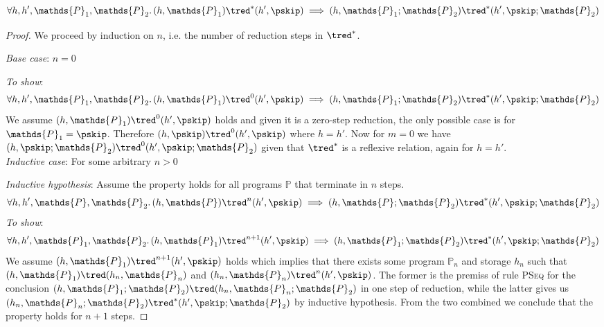 \begin{lem}
	\label{ref:aseq}
	\[
		\forall h, h', \mathds{P}_1, \mathds{P}_2 \ldotp
		(h, \mathds{P}_1) \tred^* (h', \pskip) \implies 
		(h, \mathds{P}_1; \mathds{P}_2) \tred^* (h', \pskip; \mathds{P}_2)
	\]
	
	{\parindent0pt
	\begin{proof}
	We proceed by induction on $n$, i.e. the number of reduction steps in $\tred^*$.
	
	\textit{Base case}: $n = 0$
	
	\textit{To show}: 
	\[
		\forall h, h', \mathds{P}_1, \mathds{P}_2 \ldotp
		(h, \mathds{P}_1) \tred^0 (h', \pskip) \implies 
		(h, \mathds{P}_1; \mathds{P}_2) \tred^* (h', \pskip; \mathds{P}_2)
	\]
	We assume $(h, \mathds{P}_1) \tred^0 (h', \pskip)$ holds and given it is a zero-step reduction, the only possible case is for $\mathds{P}_1 = \pskip$. Therefore $(h, \pskip) \tred^0 (h', \pskip)$ where $h = h'$. Now for $m = 0$ we have $(h, \pskip; \mathds{P}_2) \tred^0 (h', \pskip; \mathds{P}_2)$ given that $\tred^*$ is a reflexive relation, again for $h = h'$. \\
	
	\textit{Inductive case}: For some arbitrary $n > 0$
	
	\textit{Inductive hypothesis}: Assume the property holds for all programs $\mathds{P}$ that terminate in $n$ steps.
	\[
		\forall h, h', \mathds{P}, \mathds{P}_2 \ldotp
		(h, \mathds{P}) \tred^n (h', \pskip) \implies 
		(h, \mathds{P}; \mathds{P}_2) \tred^* (h', \pskip; \mathds{P}_2)
	\]
	\textit{To show}:
	\[
		\forall h, h', \mathds{P}_1, \mathds{P}_2 \ldotp
		(h, \mathds{P}_1) \tred^{n+1} (h', \pskip) \implies 
		(h, \mathds{P}_1; \mathds{P}_2) \tred^* (h', \pskip; \mathds{P}_2)
	\]
	We assume $(h, \mathds{P}_1) \tred^{n+1} (h', \pskip)$ holds which implies that there exists some program $\mathds{P}_n$ and storage $h_n$ such that $(h, \mathds{P}_1) \tred (h_n, \mathds{P}_n)$ and $(h_n, \mathds{P}_n) \tred^n (h', \pskip)$. The former is the premiss of rule \textsc{PSeq} for the conclusion $(h, \mathds{P}_1; \mathds{P}_2) \tred (h_n, \mathds{P}_n; \mathds{P}_2)$ in one step of reduction, while the latter gives us $(h_n, \mathds{P}_n; \mathds{P}_2) \tred^* (h', \pskip ; \mathds{P}_2)$ by inductive hypothesis. From the two combined we conclude that the property holds for $n + 1$ steps.
	\end{proof}
	}
\end{lem}

